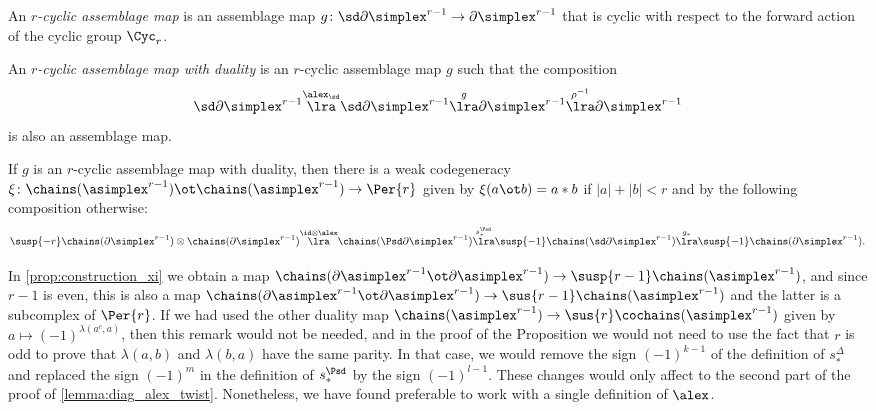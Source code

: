 \begin{definition}
	An \emph{$r$-cyclic assemblage map} is an assemblage map $g \colon \sd \partial \simplex^{r-1} \to \partial \simplex^{r-1}$ that is cyclic with respect to the forward action of the cyclic group $\Cyc_{r}$.
\end{definition}

\begin{definition}
	An \emph{$r$-cyclic assemblage map with duality} is an $r$-cyclic assemblage map $g$ such that the composition
	\[\sd \partial \simplex^{r-1} \overset{\alex_{\sd}}{\lra} \sd \partial\simplex^{r-1} \overset{g}{\lra} \partial\simplex^{r-1}\overset{\rho^{-1}}{\lra} \partial\simplex^{r-1} \]
	is also an assemblage map.
\end{definition}

\begin{proposition}\label{prop:construction_xi}
	If $g$ is an $r$-cyclic assemblage map with duality, then there is a weak codegeneracy $\xi\colon \chains(\asimplex^{r-1})\ot \chains(\asimplex^{r-1})\to \Per{r}$ given by $\xi(a\ot b) = a*b$ if $|a|+|b|<r$ and by the following composition otherwise: 
	{\small
	\[
		\susp{-r}\chains(\partial \simplex^{r-1})\otimes \chains(\partial \simplex^{r-1})
		\overset{\id\otimes \alex}{\lra}
		\chains(\Psd\partial\simplex^{r-1})
		\overset{s_*^{\Psd}}{\lra}
		\susp{-1}\chains(\sd\partial\simplex^{r-1})
		\overset{g_*}{\lra}
		\susp{-1}\chains(\partial\simplex^{r-1}).
	\]
	}
\end{proposition}
\begin{remark}
	In \cref{prop:construction_xi} we obtain a map $\chains(\partial\asimplex^{r-1}\ot \partial\asimplex^{r-1})\to \susp{r-1}\chains(\asimplex^{r-1})$, and since $r-1$ is even, this is also a map $\chains(\partial\asimplex^{r-1}\ot \partial\asimplex^{r-1})\to \sus{r-1}\chains(\asimplex^{r-1})$ and the latter is a subcomplex of $\Per{r}$. If we had used the other duality map $\chains(\asimplex^{r-1})\to \sus{r}\cochains(\asimplex^{r-1})$ given by $a\mapsto (-1)^{\lambda(a^c,a)}$, then this remark would not be needed, and in the proof of the Proposition we would not need to use the fact that $r$ is odd to prove that $\lambda(a,b)$ and $\lambda(b,a)$ have the same parity. In that case, we would remove the sign $(-1)^{k-1}$ of the definition of $s_*^{\Delta}$ and replaced the sign $(-1)^m$ in the definition of $s_*^\Psd$ by the sign $(-1)^{l-1}$. These changes would only affect to the second part of the proof of \cref{lemma:diag_alex_twist}. Nonetheless, we have found preferable to work with a single definition of $\alex$.
\end{remark}
